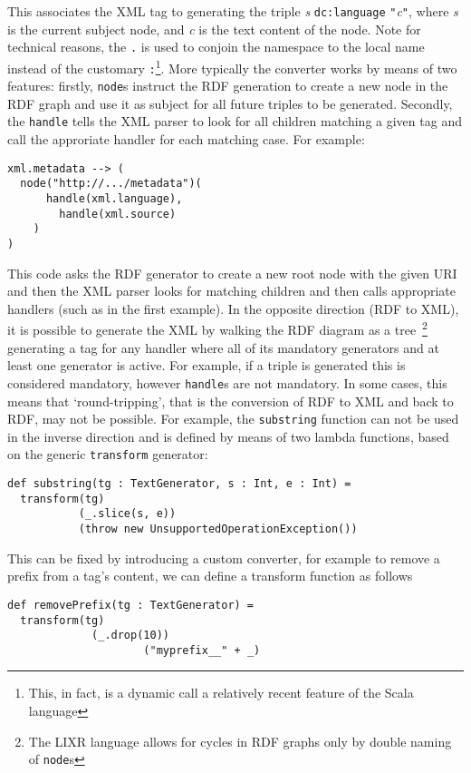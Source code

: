 \documentclass{acm_proc_article-sp}
\begin{document}
This associates the XML tag {\tt <xml:language>} to
generating the triple \emph{s} {\tt dc:language} {\tt "}\emph{c}{\tt "}, 
where \emph{s} is the current subject node, and \emph{c} is the text content of
the node. Note for technical reasons, the {\tt .} is used to conjoin the namespace
to the local name instead of the customary {\tt :}\footnote{This, in fact, is 
a dynamic call a relatively recent feature of the Scala language}. More typically
the converter works by means of two features: firstly, {\tt node}s instruct the RDF generation
to create a new node in the RDF graph and use it as subject for all future triples
to be generated. Secondly, the {\tt handle} tells the XML parser to look for all 
children matching a given tag and call the approriate handler for each matching
case. For example:

\begin{verbatim}
xml.metadata --> (
  node("http://.../metadata")(
	  handle(xml.language),
		handle(xml.source)
	)
)
\end{verbatim}

This code asks the RDF generator to create a new root node with the given URI and
then the XML parser looks for matching children and then calls appropriate handlers
(such as in the first example). In the opposite direction (RDF to XML), it is
possible to generate the XML by walking the RDF diagram as a tree~\footnote{
The LIXR language allows for cycles in RDF graphs only by double naming of
{\tt node}s} generating a
tag for any handler where all of its mandatory generators and at least one 
generator is active. For example, if a triple is generated this is considered
mandatory, however {\tt handle}s are not mandatory. In some cases, this means that
`round-tripping', that is the conversion of RDF to XML and back to RDF, may not
be possible. For example, the {\tt substring} function can not be used in the
inverse direction and is defined by means of two lambda functions, based on
the generic {\tt transform} generator:

\begin{verbatim}
def substring(tg : TextGenerator, s : Int, e : Int) =
  transform(tg)
           (_.slice(s, e))
           (throw new UnsupportedOperationException())
\end{verbatim}

This can be fixed by introducing a custom converter, for example to remove a 
prefix from a tag's content, we can define a transform function as follows

\begin{verbatim}
def removePrefix(tg : TextGenerator) =
  transform(tg)
	         (_.drop(10))
					 ("myprefix__" + _) 
\end{verbatim}
\end{document}
